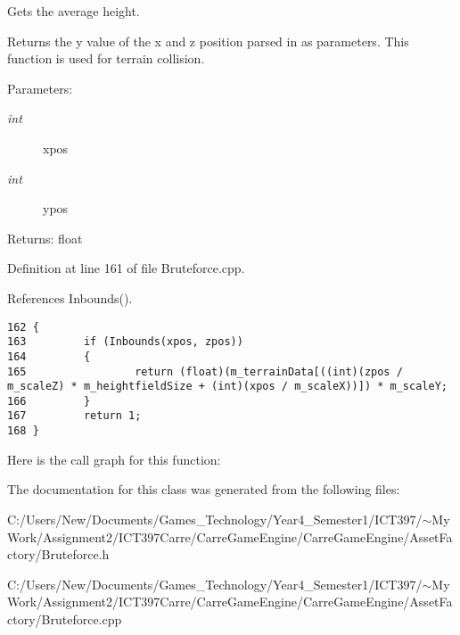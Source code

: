 Gets the average height. 

Returns the y value of the x and z position parsed in as parameters. This function is used for terrain collision.

\begin{Desc}
\item[Parameters:]
\begin{description}
\item[{\em int}]xpos \item[{\em int}]ypos \end{description}
\end{Desc}
\begin{Desc}
\item[Returns:]float \end{Desc}


Definition at line 161 of file Bruteforce.cpp.

References Inbounds().

\begin{Code}\begin{verbatim}162 {
163         if (Inbounds(xpos, zpos))
164         {
165                 return (float)(m_terrainData[((int)(zpos / m_scaleZ) * m_heightfieldSize + (int)(xpos / m_scaleX))]) * m_scaleY;
166         }
167         return 1;
168 }
\end{verbatim}
\end{Code}




Here is the call graph for this function:

The documentation for this class was generated from the following files:\begin{CompactItemize}
\item 
C:/Users/New/Documents/Games\_\-Technology/Year4\_\-Semester1/ICT397/$\sim$My Work/Assignment2/ICT397Carre/CarreGameEngine/CarreGameEngine/AssetFactory/Bruteforce.h\item 
C:/Users/New/Documents/Games\_\-Technology/Year4\_\-Semester1/ICT397/$\sim$My Work/Assignment2/ICT397Carre/CarreGameEngine/CarreGameEngine/AssetFactory/Bruteforce.cpp\end{CompactItemize}
